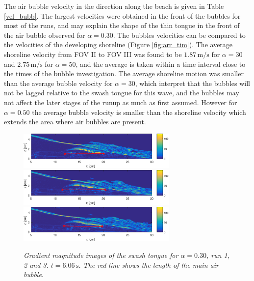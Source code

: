 \documentclass[review, authoryear]{elsarticle}
\newcommand{\s}{\,\mbox{s}}
\newcommand{\mps}{\,\mbox{m/s}}
\begin{document}
The air bubble velocity in the direction along the beach is given in Table \ref{vel_bubb}. The largest velocities were obtained in the front of the bubbles for most of the runs, and may explain the shape of the thin tongue in the front of the air bubble observed for $\alpha=0.30$. The bubbles velocities can be compared to the velocities of the developing shoreline (Figure \ref{fig:arr_tim}). The average shoreline velocity from  FOV II to FOV III was found to be $1.87\mps$ for $\alpha=30$ and $2.75\mps$ for $\alpha=50$, and the average is taken within a time interval close to the times of the bubble investigation. The average shoreline motion was smaller than the average bubble velocity for $\alpha=30$, which interpret that the bubbles will not be lagged relative to the swash tongue for this wave, and the bubbles may not affect the later stages of the runup as much as first assumed. However for $\alpha=0.50$ the average bubble velocity is smaller than the shoreline velocity which extends the area where air bubbles are present. 
\begin{figure}[]
\centering
\includegraphics[angle=5.1,width=0.7\textwidth]{./Figures/BUBBLE/bubble30_run1_r.eps}
\includegraphics[angle=5.1,width=0.7\textwidth]{./Figures/BUBBLE/bubble30_run2_r.eps}
\includegraphics[angle=5.1,width=0.7\textwidth]{./Figures/BUBBLE/bubble30_run3_r.eps}
\caption{\textit{Gradient magnitude images of the swash tongue for $\alpha=0.30$, run 1, 2 and 3. $t=6.06\s$. The red line shows the length of the main air bubble}.}
\label{fig:bubble_30}
\end{figure}
\end{document}
